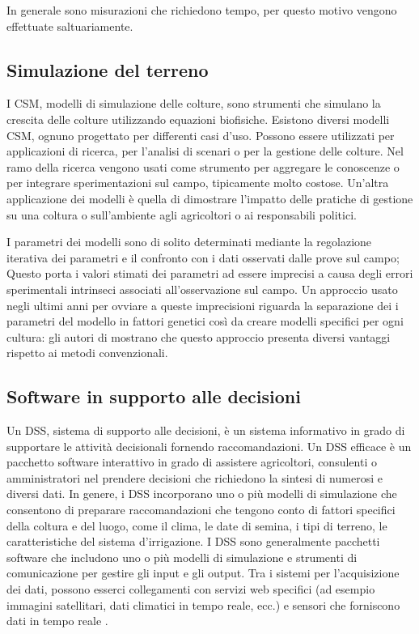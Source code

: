 \documentclass[12pt,a4paper,openright,twoside]{book}
\begin{document}
In generale sono misurazioni che richiedono tempo, per questo motivo vengono effettuate saltuariamente.

\subsection{Simulazione del terreno}

I \ac{CSM}, modelli di simulazione delle colture, sono strumenti che simulano la crescita delle colture utilizzando equazioni biofisiche\cite{KELLY2023107986}.
Esistono diversi modelli \ac{CSM}, ognuno progettato per differenti casi d'uso.
Possono essere utilizzati per applicazioni di ricerca, per l'analisi di scenari o per la gestione delle colture. Nel ramo della ricerca vengono usati come strumento per aggregare le conoscenze o per integrare sperimentazioni sul campo, tipicamente molto costose. Un'altra applicazione dei modelli è quella di dimostrare l'impatto delle pratiche di gestione su una coltura o sull'ambiente agli agricoltori o ai responsabili politici\cite{MATTHEWS201324}.

I parametri dei modelli sono di solito determinati mediante la regolazione iterativa dei parametri e il confronto con i dati osservati dalle prove sul campo; Questo porta i valori stimati dei parametri ad essere imprecisi a causa degli errori sperimentali intrinseci associati all'osservazione sul campo. Un approccio usato negli ultimi anni per ovviare a queste imprecisioni riguarda la separazione dei i parametri del modello in fattori genetici così da creare modelli specifici per ogni cultura: gli autori di \cite{LI2012219} mostrano che questo approccio presenta diversi vantaggi rispetto ai metodi convenzionali.

\subsection{Software in supporto alle decisioni}

Un \ac{DSS}, sistema di supporto alle decisioni, è un sistema informativo in grado di supportare le attività decisionali fornendo raccomandazioni. Un \ac{DSS} efficace è un pacchetto software interattivo in grado di assistere agricoltori, consulenti o amministratori nel prendere decisioni che richiedono la sintesi di numerosi e diversi dati. In genere, i DSS incorporano uno o più modelli di simulazione che consentono di preparare raccomandazioni che tengono conto di fattori specifici della coltura e del luogo, come il clima, le date di semina, i tipi di terreno, le caratteristiche del sistema d'irrigazione.
I DSS sono generalmente pacchetti software che includono uno o più modelli di simulazione e strumenti di comunicazione per gestire gli input e gli output. Tra i sistemi per l'acquisizione dei dati, possono esserci collegamenti con servizi web specifici (ad esempio immagini satellitari, dati climatici in tempo reale, ecc.) e sensori che forniscono dati in tempo reale \cite{GALLARDO2020106209}.
\newpage
\end{document}
